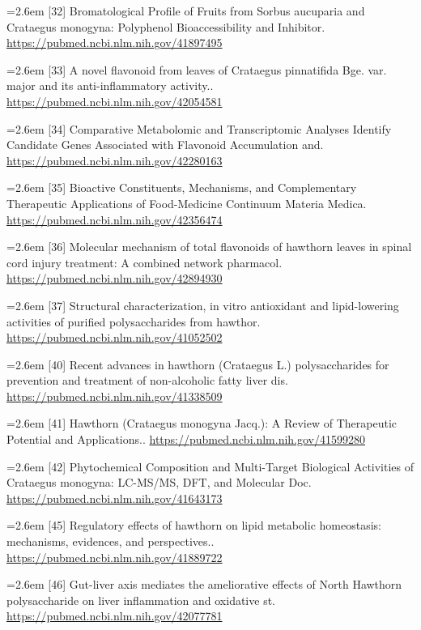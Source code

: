 \documentclass[11pt]{article}
\begin{document}
{\noindent\hangindent=2.6em [32] Bromatological Profile of Fruits from Sorbus aucuparia and Crataegus monogyna: Polyphenol Bioaccessibility and Inhibitor. \url{https://pubmed.ncbi.nlm.nih.gov/41897495}\par
\noindent\hangindent=2.6em [33] A novel flavonoid from leaves of Crataegus pinnatifida Bge. var. major and its anti-inflammatory activity.. \url{https://pubmed.ncbi.nlm.nih.gov/42054581}\par
\noindent\hangindent=2.6em [34] Comparative Metabolomic and Transcriptomic Analyses Identify Candidate Genes Associated with Flavonoid Accumulation and. \url{https://pubmed.ncbi.nlm.nih.gov/42280163}\par
\noindent\hangindent=2.6em [35] Bioactive Constituents, Mechanisms, and Complementary Therapeutic Applications of Food-Medicine Continuum Materia Medica. \url{https://pubmed.ncbi.nlm.nih.gov/42356474}\par
\noindent\hangindent=2.6em [36] Molecular mechanism of total flavonoids of hawthorn leaves in spinal cord injury treatment: A combined network pharmacol. \url{https://pubmed.ncbi.nlm.nih.gov/42894930}\par
\noindent\hangindent=2.6em [37] Structural characterization, in vitro antioxidant and lipid-lowering activities of purified polysaccharides from hawthor. \url{https://pubmed.ncbi.nlm.nih.gov/41052502}\par
\noindent\hangindent=2.6em [40] Recent advances in hawthorn (Crataegus L.) polysaccharides for prevention and treatment of non-alcoholic fatty liver dis. \url{https://pubmed.ncbi.nlm.nih.gov/41338509}\par
\noindent\hangindent=2.6em [41] Hawthorn (Crataegus monogyna Jacq.): A Review of Therapeutic Potential and Applications.. \url{https://pubmed.ncbi.nlm.nih.gov/41599280}\par
\noindent\hangindent=2.6em [42] Phytochemical Composition and Multi-Target Biological Activities of Crataegus monogyna: LC-MS/MS, DFT, and Molecular Doc. \url{https://pubmed.ncbi.nlm.nih.gov/41643173}\par
\noindent\hangindent=2.6em [45] Regulatory effects of hawthorn on lipid metabolic homeostasis: mechanisms, evidences, and perspectives.. \url{https://pubmed.ncbi.nlm.nih.gov/41889722}\par
\noindent\hangindent=2.6em [46] Gut-liver axis mediates the ameliorative effects of North Hawthorn polysaccharide on liver inflammation and oxidative st. \url{https://pubmed.ncbi.nlm.nih.gov/42077781}\par
}
\end{document}
